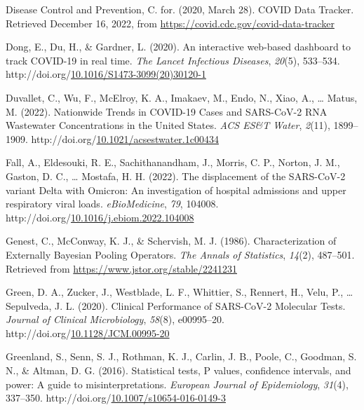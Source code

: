 \documentclass[12pt,twoside]{smiththesis}
\newlength{\cslhangindent}
\newenvironment{CSLReferences}[2] %
 {%
\setlength{\parindent}{0pt}
\ifodd #1 \everypar{\setlength{\hangindent}{\cslhangindent}}\ignorespaces\fi
\ifnum #2 > 0
\setlength{\parskip}{#2\baselineskip}
  \fi
}%
{}
\begin{document}
\begin{CSLReferences}{1}{0}
\leavevmode{}%
Disease Control and Prevention, C. for. (2020, March 28). {COVID Data Tracker}. Retrieved December 16, 2022, from \url{https://covid.cdc.gov/covid-data-tracker}

\leavevmode{}%
Dong, E., Du, H., \& Gardner, L. (2020). An interactive web-based dashboard to track {COVID-19} in real time. \emph{The Lancet Infectious Diseases}, \emph{20}(5), 533--534. http://doi.org/\href{https://doi.org/10.1016/S1473-3099(20)30120-1}{10.1016/S1473-3099(20)30120-1}

\leavevmode{}%
Duvallet, C., Wu, F., McElroy, K. A., Imakaev, M., Endo, N., Xiao, A., \ldots{} Matus, M. (2022). Nationwide {Trends} in {COVID-19 Cases} and {SARS-CoV-2 RNA Wastewater Concentrations} in the {United States}. \emph{ACS ES\&T Water}, \emph{2}(11), 1899--1909. http://doi.org/\href{https://doi.org/10.1021/acsestwater.1c00434}{10.1021/acsestwater.1c00434}

\leavevmode{}%
Fall, A., Eldesouki, R. E., Sachithanandham, J., Morris, C. P., Norton, J. M., Gaston, D. C., \ldots{} Mostafa, H. H. (2022). The displacement of the {SARS-CoV-2} variant {Delta} with {Omicron}: {An} investigation of hospital admissions and upper respiratory viral loads. \emph{eBioMedicine}, \emph{79}, 104008. http://doi.org/\href{https://doi.org/10.1016/j.ebiom.2022.104008}{10.1016/j.ebiom.2022.104008}

\leavevmode{}%
Genest, C., McConway, K. J., \& Schervish, M. J. (1986). Characterization of {Externally Bayesian Pooling Operators}. \emph{The Annals of Statistics}, \emph{14}(2), 487--501. Retrieved from \url{https://www.jstor.org/stable/2241231}

\leavevmode{}%
Green, D. A., Zucker, J., Westblade, L. F., Whittier, S., Rennert, H., Velu, P., \ldots{} Sepulveda, J. L. (2020). Clinical {Performance} of {SARS-CoV-2 Molecular Tests}. \emph{Journal of Clinical Microbiology}, \emph{58}(8), e00995--20. http://doi.org/\href{https://doi.org/10.1128/JCM.00995-20}{10.1128/JCM.00995-20}

\leavevmode{}%
Greenland, S., Senn, S. J., Rothman, K. J., Carlin, J. B., Poole, C., Goodman, S. N., \& Altman, D. G. (2016). Statistical tests, {P} values, confidence intervals, and power: A guide to misinterpretations. \emph{European Journal of Epidemiology}, \emph{31}(4), 337--350. http://doi.org/\href{https://doi.org/10.1007/s10654-016-0149-3}{10.1007/s10654-016-0149-3}


\end{CSLReferences}
\end{document}
